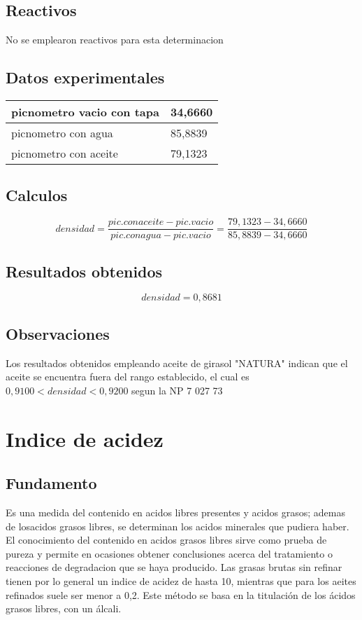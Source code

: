 \documentclass[a4paper,12pt]{article} %
\begin{document}
\subsection{Reactivos} 
No se emplearon reactivos para esta determinacion


\subsection{Datos experimentales}

\begin{table}[H]
\begin{tabular}{@{}|l|l|@{}}
\toprule
picnometro vacio con tapa & 34,6660 \\ \midrule
picnometro con agua       & 85,8839 \\ \midrule
picnometro con aceite     & 79,1323 \\ \bottomrule
\end{tabular}
\end{table}
\subsection{Calculos}
\[densidad=\frac{pic.con aceite-pic. vacio}{pic. con agua-pic. vacio}=\frac{79,1323-34,6660}{85,8839-34,6660}\]
\subsection{Resultados obtenidos}
\[densidad=0,8681\]
\subsection{Observaciones}
Los resultados obtenidos empleando aceite de girasol "NATURA" indican que el aceite se encuentra fuera del rango establecido, el cual es $0,9100<densidad<0,9200$ segun la NP 7 027 73



\newpage

\section{Indice de acidez}

\subsection{Fundamento} 
  Es una medida del contenido en acidos libres presentes y acidos grasos; ademas de losacidos grasos libres, se determinan los acidos minerales que pudiera haber. El conocimiento del contenido en acidos grasos libres sirve como prueba de pureza y permite en ocasiones obtener conclusiones acerca del tratamiento o reacciones de degradacion que se haya producido. Las grasas brutas sin refinar tienen por lo general un indice de acidez de hasta 10, mientras que para los aeites refinados suele ser menor a 0,2.
  Este método se basa en la titulación de los ácidos grasos libres, con un álcali. 
\end{document}
